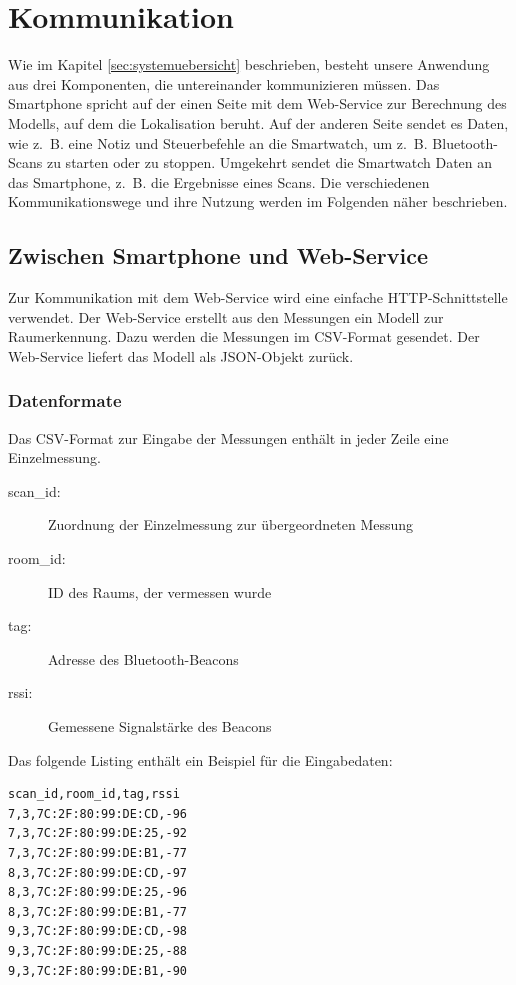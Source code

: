 \section{Kommunikation}
Wie im Kapitel \ref{sec:systemuebersicht} beschrieben, besteht unsere Anwendung aus drei Komponenten, die untereinander kommunizieren müssen. Das Smartphone spricht auf der einen Seite mit dem Web-Service zur Berechnung des Modells, auf dem die Lokalisation beruht. Auf der anderen Seite sendet es Daten, wie z.~B. eine Notiz und Steuerbefehle an die Smartwatch, um z.~B. Bluetooth-Scans zu starten oder zu stoppen. Umgekehrt sendet die Smartwatch Daten an das Smartphone, z.~B. die Ergebnisse eines Scans. Die verschiedenen Kommunikationswege und ihre Nutzung werden im Folgenden näher beschrieben.

\subsection{Zwischen Smartphone und Web-Service}

Zur Kommunikation mit dem Web-Service wird eine einfache HTTP-Schnittstelle verwendet.
Der Web-Service erstellt aus den Messungen ein Modell zur Raumerkennung. Dazu
werden die Messungen im CSV-Format gesendet. Der Web-Service liefert das Modell
als JSON-Objekt zurück.

\subsubsection{Datenformate}

Das CSV-Format zur Eingabe der Messungen enthält in jeder Zeile eine Einzelmessung.
\begin{description}
	\item[scan\_id:] Zuordnung der Einzelmessung zur übergeordneten Messung
	\item[room\_id:] ID des Raums, der vermessen wurde
	\item[tag:] Adresse des Bluetooth-Beacons
	\item[rssi:] Gemessene Signalstärke des Beacons
\end{description}

Das folgende Listing enthält ein Beispiel für die Eingabedaten:
\begin{lstlisting}
scan_id,room_id,tag,rssi
7,3,7C:2F:80:99:DE:CD,-96
7,3,7C:2F:80:99:DE:25,-92
7,3,7C:2F:80:99:DE:B1,-77
8,3,7C:2F:80:99:DE:CD,-97
8,3,7C:2F:80:99:DE:25,-96
8,3,7C:2F:80:99:DE:B1,-77
9,3,7C:2F:80:99:DE:CD,-98
9,3,7C:2F:80:99:DE:25,-88
9,3,7C:2F:80:99:DE:B1,-90
\end{lstlisting}

